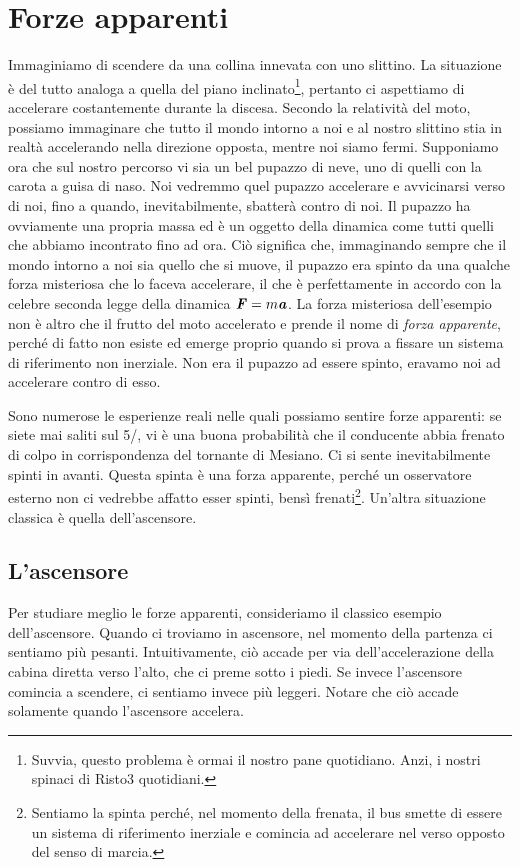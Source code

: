\section{Forze apparenti}
Immaginiamo di scendere da una collina innevata con uno slittino.
La situazione è del tutto analoga a quella del piano inclinato\footnote{Suvvia,
questo problema è ormai il nostro pane quotidiano. Anzi, i nostri spinaci di
Risto3 quotidiani.}, pertanto ci aspettiamo di accelerare costantemente
durante la discesa. Secondo la relatività del moto, possiamo immaginare che
tutto il mondo intorno a noi e al nostro slittino stia in realtà accelerando
nella direzione opposta, mentre noi siamo fermi. Supponiamo ora che sul
nostro percorso vi sia un bel pupazzo di neve, uno di quelli con la carota
a guisa di naso. Noi vedremmo quel pupazzo accelerare e avvicinarsi verso
di noi, fino a quando, inevitabilmente, sbatterà contro di noi. Il pupazzo
ha ovviamente una propria massa ed è un oggetto della dinamica come tutti
quelli che abbiamo incontrato fino ad ora. Ciò significa che, immaginando
sempre che il mondo intorno a noi sia quello che si muove, il pupazzo
era spinto da una qualche forza misteriosa che lo faceva accelerare, il che è perfettamente
in accordo con la celebre seconda legge della dinamica $\textbf{\textit{F}} = m\textbf{\textit{a}}$.
La forza misteriosa dell'esempio non è altro che il frutto del moto
accelerato e prende il nome di \emph{forza apparente}, perché di fatto
non esiste ed emerge proprio quando si prova a fissare un sistema di
riferimento non inerziale. Non era il pupazzo ad essere spinto, eravamo
noi ad accelerare contro di esso.

Sono numerose le esperienze reali nelle quali possiamo sentire forze
apparenti: se siete mai saliti sul 5/, vi è una buona probabilità che
il conducente abbia frenato di colpo in corrispondenza del tornante
di Mesiano. Ci si sente inevitabilmente spinti in avanti. Questa spinta
è una forza apparente, perché un osservatore esterno non ci vedrebbe
affatto esser spinti, bensì frenati\footnote{Sentiamo la spinta perché,
nel momento della frenata, il bus smette di essere un sistema di riferimento
inerziale e comincia ad accelerare nel verso opposto del senso di marcia.}.
Un'altra situazione classica è quella dell'ascensore.

\subsection{L'ascensore}
Per studiare meglio le forze apparenti, consideriamo il classico
esempio dell'ascensore. Quando ci troviamo in ascensore, nel
momento della partenza ci sentiamo più pesanti. Intuitivamente,
ciò accade per via dell'accelerazione della cabina diretta verso
l'alto, che ci preme sotto i piedi. Se invece l'ascensore comincia
a scendere, ci sentiamo invece più leggeri. Notare che ciò accade
solamente quando l'ascensore accelera.

